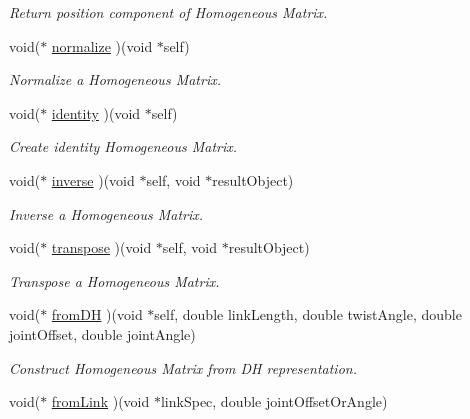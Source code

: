 \begin{CompactItemize}
\begin{CompactList}\small\item\em Return position component of Homogeneous Matrix. \item\end{CompactList}\item 
void($\ast$ \hyperlink{structdrdc__HMatrix__t_8230fd2af3d183116fa13ccf499c3ab5}{normalize} )(void $\ast$self)
\begin{CompactList}\small\item\em Normalize a Homogeneous Matrix. \item\end{CompactList}\item 
void($\ast$ \hyperlink{structdrdc__HMatrix__t_d574009aefa57168f502263da6ff25bc}{identity} )(void $\ast$self)
\begin{CompactList}\small\item\em Create identity Homogeneous Matrix. \item\end{CompactList}\item 
void($\ast$ \hyperlink{structdrdc__HMatrix__t_004d664a140115f5ef8f2b093cdab339}{inverse} )(void $\ast$self, void $\ast$resultObject)
\begin{CompactList}\small\item\em Inverse a Homogeneous Matrix. \item\end{CompactList}\item 
void($\ast$ \hyperlink{structdrdc__HMatrix__t_1f0e7eb07e96722033da212cc9b25518}{transpose} )(void $\ast$self, void $\ast$resultObject)
\begin{CompactList}\small\item\em Transpose a Homogeneous Matrix. \item\end{CompactList}\item 
void($\ast$ \hyperlink{structdrdc__HMatrix__t_ce4ff366265225689e58b5eee5323170}{fromDH} )(void $\ast$self, double linkLength, double twistAngle, double jointOffset, double jointAngle)
\begin{CompactList}\small\item\em Construct Homogeneous Matrix from DH representation. \item\end{CompactList}\item 
void($\ast$ \hyperlink{structdrdc__HMatrix__t_bdb80598a4a45e67b52ef3a910d4c6f1}{fromLink} )(void $\ast$linkSpec, double jointOffsetOrAngle)

\end{CompactItemize}
